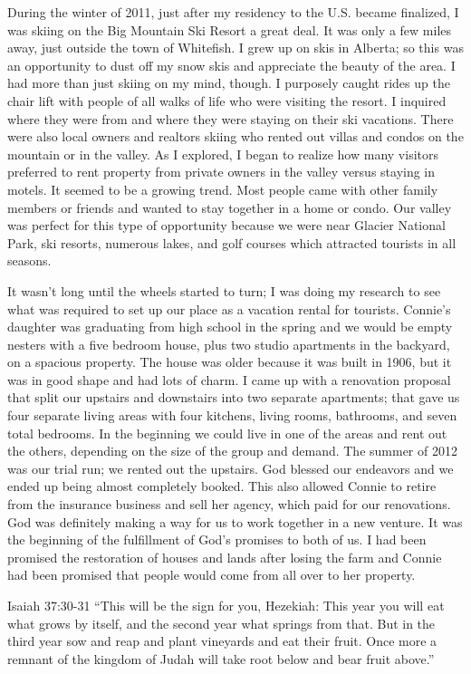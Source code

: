 \documentclass[oneside]{book}
\begin{document}
During the winter of 2011, just after my residency to the U.S. became finalized, I was skiing on the Big Mountain Ski Resort a great deal. It was only a few miles away, just outside the town of Whitefish. I grew up on skis in Alberta; so this was an opportunity to dust off my snow skis and appreciate the beauty of the area. I had more than just skiing on my mind, though. I purposely caught rides up the chair lift with people of all walks of life who were visiting the resort. I inquired where they were from and where they were staying on their ski vacations. There were also local owners and realtors skiing who rented out villas and condos on the mountain or in the valley. As I explored, I began to realize how many visitors preferred to rent property from private owners in the valley versus staying in motels. It seemed to be a growing trend. Most people came with other family members or friends and wanted to stay together in a home or condo. Our valley was perfect for this type of opportunity because we were near Glacier National Park, ski resorts, numerous lakes, and golf courses which attracted tourists in all seasons.

It wasn’t long until the wheels started to turn; I was doing my research to see what was required to set up our place as a vacation rental for tourists. Connie’s daughter was graduating from high school in the spring and we would be empty nesters with a five bedroom house, plus two studio apartments in the backyard, on a spacious property. The house was older because it was built in 1906, but it was in good shape and had lots of charm. I came up with a renovation proposal that split our upstairs and downstairs into two separate apartments; that gave us four separate living areas with four kitchens, living rooms, bathrooms, and seven total bedrooms. In the beginning we could live in one of the areas and rent out the others, depending on the size of the group and demand. The summer of 2012 was our trial run; we rented out the upstairs. God blessed our endeavors and we ended up being almost completely booked. This also allowed Connie to retire from the insurance business and sell her agency, which paid for our renovations. God was definitely making a way for us to work together in a new venture. It was the beginning of the fulfillment of God’s promises to both of us. I had been promised the restoration of houses and lands after losing the farm and Connie had been promised that people would come from all over to her property. 

Isaiah 37:30-31 “This will be the sign for you, Hezekiah: This year you will eat what grows by itself, and the second year what springs from that. But in the third year sow and reap and plant vineyards and eat their fruit. Once more a remnant of the kingdom of Judah will take root below and bear fruit above.”
\end{document}
